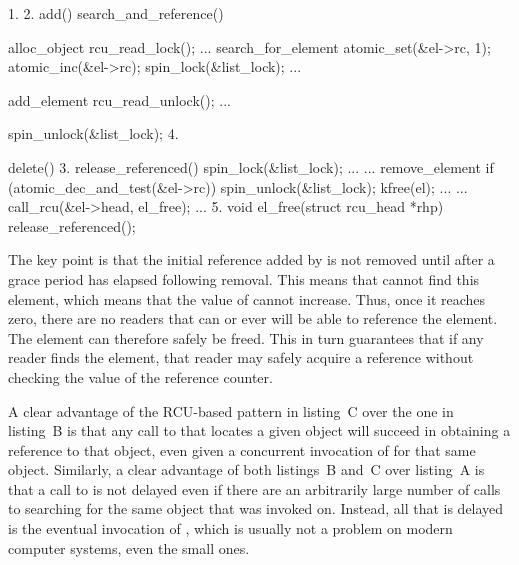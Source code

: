 \vspace{2ex}
\begin{VerbatimU}[fontsize=\tiny,label={\small{CODE LISTING C}}]
    1.                                      2.
    add()                                   search_and_reference()
    {                                       {
        alloc_object                            rcu_read_lock();
        ...                                     search_for_element
        atomic_set(&el->rc, 1);                 atomic_inc(&el->rc);
        spin_lock(&list_lock);                  ...

        add_element                             rcu_read_unlock();
        ...                                 }
        spin_unlock(&list_lock);            4.
    }                                       delete()
    3.                                      {
    release_referenced()                        spin_lock(&list_lock);
    {                                           ...
        ...                                     remove_element
        if (atomic_dec_and_test(&el->rc))       spin_unlock(&list_lock);
            kfree(el);                          ...
        ...                                     call_rcu(&el->head, el_free);
    }                                           ...
    5.                                      }
    void el_free(struct rcu_head *rhp)
    {
        release_referenced();
    }
\end{VerbatimU}

The key point is that the initial reference added by  is not removed
until after a grace period has elapsed following removal.
This means that
 cannot find this element, which means that the value
of  cannot increase.
Thus, once it reaches zero, there are no
readers that can or ever will be able to reference the element.
The
element can therefore safely be freed.
This in turn guarantees that if
any reader finds the element, that reader may safely acquire a reference
without checking the value of the reference counter.

A clear advantage of the RCU-based pattern in listing~C over the one
in listing~B is that any call to  that locates
a given object will succeed in obtaining a reference to that object,
even given a concurrent invocation of  for that same object.
Similarly, a clear advantage of both listings~B and~C over listing~A is
that a call to  is not delayed even if there are an arbitrarily
large number of calls to  searching for the same
object that  was invoked on.
Instead, all that is delayed is
the eventual invocation of , which is usually not a problem on
modern computer systems, even the small ones.

